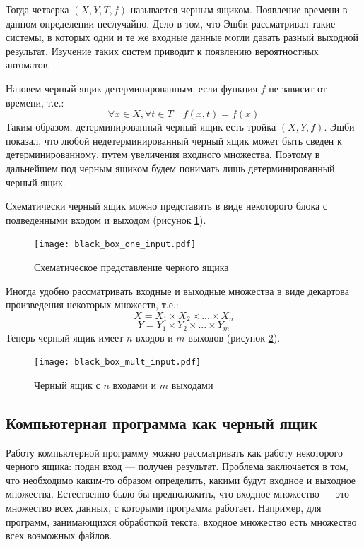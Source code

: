 \documentclass[a4paper,14pt,href]{article}
\begin{document}
Тогда четверка $(X,Y,T,f)$ называется черным ящиком. Появление времени в данном определении неслучайно. Дело в том, что Эшби рассматривал такие системы, в которых одни и те же входные данные могли давать разный выходной результат. Изучение таких систем приводит к появлению вероятностных автоматов. 

Назовем черный ящик детерминированным, если функция $f$ не зависит от времени, т.е.:
	$$ \forall x \in X, \forall t \in T \quad f(x,t)=f(x) $$
Таким образом, детерминированный черный ящик есть тройка $(X,Y,f)$. Эшби показал, что любой недетерминированный черный ящик может быть сведен к детерминированному, путем увеличения входного множества. Поэтому в дальнейшем под черным ящиком будем понимать лишь детерминированный черный ящик.

	Схематически черный ящик можно представить в виде некоторого блока с подведенными входом и выходом (рисунок \ref{fig:BlackBoxOne}).

\begin{figure}[htbp]
\begin{center}
	\texttt{[image: black\_box\_one\_input.pdf]}
    \caption{Схематическое представление черного ящика}
    \label{fig:BlackBoxOne}
\end{center}
\end{figure}

	Иногда удобно рассматривать входные и выходные множества в виде декартова произведения некоторых множеств, т.е.:
	$$ X = X_{1} \times X_{2} \times ... \times X_{n} $$ 
	$$ Y = Y_{1} \times Y_{2} \times ... \times Y_{m} $$ 
Теперь черный ящик имеет $n$ входов и $m$ выходов (рисунок \ref{fig:BlackBoxMult}).
	 
\begin{figure}[htbp]
\begin{center}
	\texttt{[image: black\_box\_mult\_input.pdf]}
    \caption{Черный ящик с $n$ входами и $m$ выходами}
    \label{fig:BlackBoxMult}
\end{center}
\end{figure}

\subsection{Компьютерная программа как черный ящик}
	Работу компьютерной программу можно рассматривать как работу некоторого черного ящика: подан вход --- получен результат. Проблема заключается в том, что необходимо каким-то образом определить, какими будут входное и выходное множества. Естественно было бы предположить, что входное множество --- это множество всех данных, с которыми программа работает. Например, для программ, занимающихся обработкой текста, входное множество есть множество всех возможных файлов.
	
\end{document}
